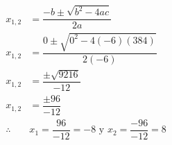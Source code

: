 \begin{solutionbox}{13cm}
\begin{multicols}{2}
\begin{align*}
            x_{1,2}    & = \dfrac{-b\pm\sqrt{b^2-4ac}}{2a}
            \\[2em]
            x_{1,2}    & = \dfrac{0\pm\sqrt{0^2-4(-6)(384)}}{2(-6)}
            \\[2em]
            x_{1,2}    & = \dfrac{\pm\sqrt{9216}}{-12}
            \\[2em]
            x_{1,2}    & = \dfrac{\pm96}{-12}
            \\[2em]
            \therefore & x_1 =\dfrac{96}{-12}=-8 \text{ y }  x_2
            =\dfrac{-96}{-12}=8                                     \\[2em]
        \end{align*}
    \end{multicols}
\end{solutionbox}
